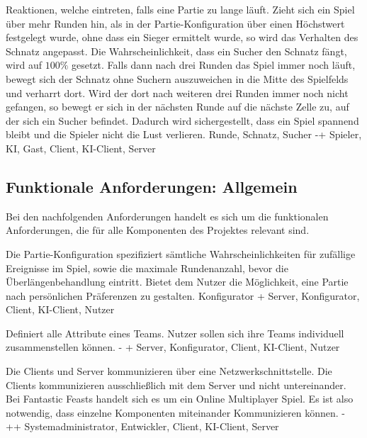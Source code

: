         {Reaktionen, welche eintreten, falls eine Partie zu lange läuft. Zieht sich ein Spiel über mehr Runden hin, als in der Partie-Konfiguration über einen Höchstwert festgelegt wurde, ohne dass ein Sieger ermittelt wurde, so wird das Verhalten des Schnatz angepasst. Die Wahrscheinlichkeit, dass ein Sucher den Schnatz fängt, wird auf $100\%$ gesetzt. Falls dann nach drei Runden das Spiel immer noch läuft, bewegt sich der Schnatz ohne Suchern auszuweichen in die Mitte des Spielfelds und verharrt dort. Wird der dort nach weiteren drei Runden immer noch nicht gefangen, so bewegt er sich in der nächsten Runde auf die nächste Zelle zu, auf der sich ein Sucher befindet.}
        {Dadurch wird sichergestellt, dass ein Spiel spannend bleibt und die Spieler nicht die Lust verlieren.}
        {Runde, Schnatz, Sucher}
        {-+}
        {Spieler, KI, Gast, Client, KI-Client, Server}


\subsection{Funktionale Anforderungen: Allgemein}

Bei den nachfolgenden Anforderungen handelt es sich um die funktionalen Anforderungen, die für alle Komponenten des Projektes relevant sind.

        {Die Partie-Konfiguration spezifiziert sämtliche Wahrscheinlichkeiten für zufällige Ereignisse im Spiel, sowie die maximale Rundenanzahl, bevor die Überlängenbehandlung eintritt.}
        {Bietet dem Nutzer die Möglichkeit, eine Partie nach persönlichen Präferenzen zu gestalten.}
        {Konfigurator}
        {+}
        {Server, Konfigurator, Client, KI-Client, Nutzer}

        {Definiert alle Attribute eines Teams.}
        {Nutzer sollen sich ihre Teams individuell zusammenstellen können.}
        {-}
        {+}
        {Server, Konfigurator, Client, KI-Client, Nutzer}	
        
        {Die Clients und Server kommunizieren über eine Netzwerkschnittstelle. Die Clients kommunizieren ausschließlich mit dem Server und nicht untereinander.}
        {Bei \glqq{}Fantastic Feasts\grqq{} handelt sich es um ein Online Multiplayer Spiel. Es ist also notwendig, dass einzelne Komponenten miteinander Kommunizieren können.}
        {-}
        {++}
        {Systemadministrator, Entwickler, Client, KI-Client, Server}

